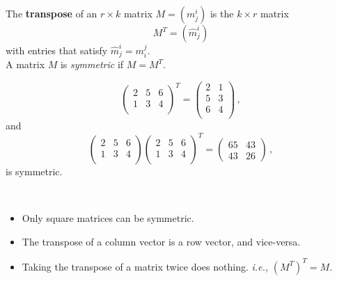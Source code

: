 \begin{definition}
The {\bfseries transpose} of an $r\times k$ matrix $M = (m_j^i)$ is the $k\times r$ matrix 
\[
M^T = (\hat{m}_j^i)
\]
with entries that satisfy $\hat{m}_j^i = m_i^j$. \\

A matrix $M$ is \emph{symmetric} if $M=M^T$.
\end{definition}

\begin{example}
\[\begin{pmatrix}
2 & 5 & 6\\
1 & 3 & 4\\
\end{pmatrix}^T = 
\begin{pmatrix}
2 & 1 \\
5 & 3 \\
6 & 4 \\
\end{pmatrix}\, ,\]
and
\[
\begin{pmatrix}
2 & 5 & 6\\
1 & 3 & 4\\
\end{pmatrix}
\begin{pmatrix}
2 & 5 & 6\\
1 & 3 & 4\\
\end{pmatrix}^T = 
\begin{pmatrix}
65&43\\43&26
\end{pmatrix}\, ,\]
is symmetric.


\end{example}


\begin{remark}[Observations]

$\phantom{test}$

\begin{itemize}
\item Only square matrices can be symmetric.

\item The transpose of a column vector is a row vector, and vice-versa. 

\item Taking the transpose of a matrix twice does nothing.  \emph{i.e.,} $(M^T)^T=M$.
\end{itemize}
\end{remark}

